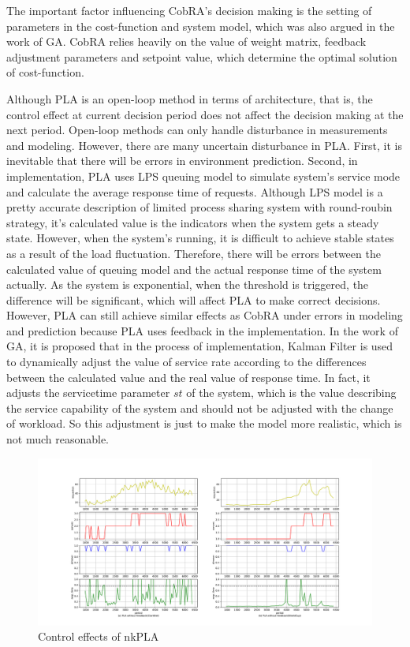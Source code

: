 \documentclass[sigconf]{acmart}
\begin{document}
The important factor influencing CobRA's decision making is the setting of parameters in the cost-function and system model, which was also argued in the work of GA. CobRA relies heavily on the value of weight matrix, feedback adjustment parameters and setpoint value, which determine the optimal solution of cost-function.

Although PLA is an open-loop method in terms of architecture, that is, the control effect at current decision period does not affect the decision making at the next period. Open-loop methods can only handle disturbance in measurements and modeling. However, there are many uncertain disturbance in PLA. First, it is inevitable that there will be errors in environment prediction. Second, in implementation, PLA uses LPS queuing model\cite{zhang2008steady} to simulate system's service mode and calculate the average response time of requests. Although LPS model is a pretty accurate description of limited process sharing system with round-roubin strategy, it's calculated value is the indicators when the system gets a steady state. However, when the system's running, it is difficult to achieve stable states as a result of the load fluctuation.
Therefore, there will be errors between the calculated value of queuing model and the actual response time of the system actually. As the system is exponential, when the threshold is triggered, the difference will be significant, which will affect PLA to make correct decisions. However, PLA can still achieve similar effects as CobRA under errors in modeling and prediction because PLA uses feedback in the implementation.
In the work of GA\cite{thesis}, it is proposed that in the process of implementation, Kalman Filter is used to dynamically adjust the value of service rate according to the differences between the calculated value and the real value of response time. In fact, it adjusts the servicetime parameter $st$ of the system, which is the value describing the service capability of the system and should not be adjusted with the change of workload. So this adjustment is just to make the model more realistic, which is not much reasonable.
\begin{figure}[h]
	\centering
	\includegraphics[width=\linewidth]{nokalman}
	\caption{Control effects of nkPLA}
	\label{nokalman}
\end{figure}
\end{document}
